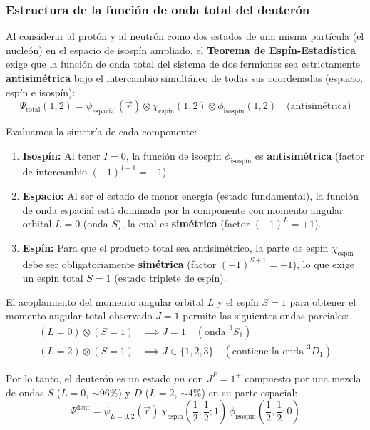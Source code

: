 \subsubsection*{Estructura de la función de onda total del deuterón}

Al considerar al protón y al neutrón como dos estados de una misma partícula (el nucleón) en el espacio de isospín ampliado, el \textbf{Teorema de Espín-Estadística} exige que la función de onda total del sistema de dos fermiones sea estrictamente \textbf{antisimétrica} bajo el intercambio simultáneo de todas sus coordenadas (espacio, espín e isospín):
\begin{equation}
    \Psi_{\text{total}}(1, 2) = \psi_{\text{espacial}}(\vec{r}) \otimes \chi_{\text{espín}}(1, 2) \otimes \phi_{\text{isospín}}(1, 2) \quad \text{(antisimétrica)}
\end{equation}

Evaluamos la simetría de cada componente:
\begin{enumerate}
    \item \textbf{Isospín:} Al tener $I=0$, la función de isospín $\phi_{\text{isospín}}$ es \textbf{antisimétrica} (factor de intercambio $(-1)^{I+1} = -1$).
    \item \textbf{Espacio:} Al ser el estado de menor energía (estado fundamental), la función de onda espacial está dominada por la componente con momento angular orbital $L=0$ (onda $S$), la cual es \textbf{simétrica} (factor $(-1)^L = +1$).
    \item \textbf{Espín:} Para que el producto total sea antisimétrico, la parte de espín $\chi_{\text{espín}}$ debe ser obligatoriamente \textbf{simétrica} (factor $(-1)^{S+1} = +1$), lo que exige un espín total $S=1$ (estado triplete de espín).
\end{enumerate}

El acoplamiento del momento angular orbital $L$ y el espín $S=1$ para obtener el momento angular total observado $J=1$ permite las siguientes ondas parciales:
\begin{align}
    (L=0) \otimes (S=1) &\implies J = 1 \quad (\text{onda } ^3S_1) \\
    (L=2) \otimes (S=1) &\implies J \in \{1, 2, 3\} \quad (\text{contiene la onda } ^3D_1)
\end{align}

Por lo tanto, el deuterón es un estado $pn$ con $J^P = 1^+$ compuesto por una mezcla de ondas $S$ ($L=0$, $\sim 96\%$) y $D$ ($L=2$, $\sim 4\%$) en su parte espacial:
\begin{equation}
    \Psi^{\text{deut}} = \psi_{L=0,2}(\vec{r}) \, \chi_{\text{espín}}\left(\frac{1}{2}, \frac{1}{2}; 1\right) \, \phi_{\text{isospín}}\left(\frac{1}{2}, \frac{1}{2}; 0\right)
\end{equation}

